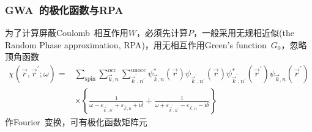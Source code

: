 \documentclass[cjk,slidestop,compress,mathserif,blue]{beamer}
\begin{document}
\frame
{
	\frametitle{\textrm{GWA~}的极化函数与\textrm{RPA}}
	为了计算屏蔽\textrm{Coulomb~}相互作用$W$，必须先计算$P$，一般采用无规相近似(\textrm{the Random Phase approximation, RPA})，用无相互作用\textrm{Green's function~}$G_0$，忽略顶角函数
	\begin{displaymath}
		\begin{aligned}
			\chi(\vec r,\vec r^{\prime};\omega)=&\sum_{\mathrm{spin}}\sum_{\vec k,n}^{\mathrm{occ}}\sum_{\vec k^{\prime},n^{\prime}}^{\mathrm{unocc}}\psi_{\vec k,n}^{\ast}(\vec r)\psi_{\vec k^{\prime},n^{\prime}}(\vec r)\psi_{\vec k^{\prime},n^{\prime}}^{\ast}(\vec r^{\prime})\psi_{\vec k,n}(\vec r^{\prime})\\
			&\times\left\{ \frac1{\omega-\varepsilon_{\vec k^{\prime},n^{\prime}}+\varepsilon_{\vec k,n}+\mathrm{i}\delta}+\frac1{\omega+\varepsilon_{\vec k^{\prime},n^{\prime}}-\varepsilon_{\vec k,n}-\mathrm{i}\delta} \right\}
		\end{aligned}
	\end{displaymath}
	作\textrm{Fourier~}变换，可有极化函数矩阵元
	\fontsize{7.5pt}{6.2pt}
}
\end{document}
